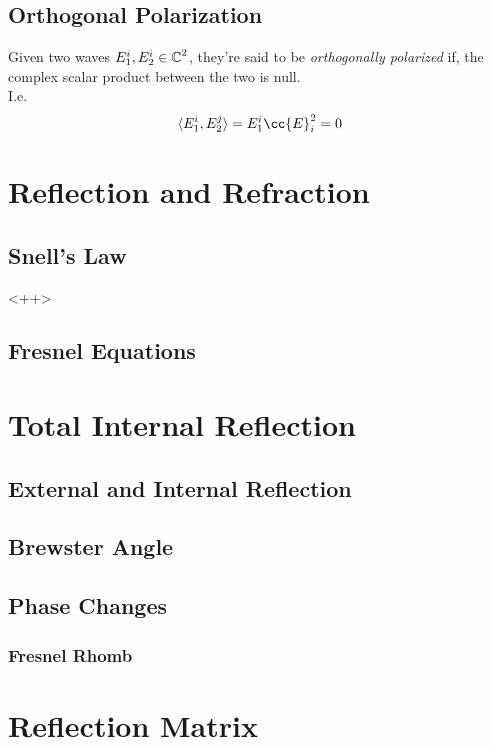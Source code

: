 \documentclass[../electromagnetism.tex]{subfiles}
\begin{document}
\subsection{Orthogonal Polarization}
Given two waves $E_1^i,E_2^i\in\operatorname{\mathbb{C}}^2$, they're said to be \textit{orthogonally polarized} if, the complex scalar product between the two is null.\\
I.e.
\begin{equation}
	\langle E_1^i, E_2^j \rangle = E_1^i\cc{E}^2_i=0
	\label{eq:orthpol}
\end{equation}
%
\section{Reflection and Refraction}
\subsection{Snell's Law}
<++>
\subsection{Fresnel Equations}
\section{Total Internal Reflection}
\subsection{External and Internal Reflection}
\subsection{Brewster Angle}
\subsection{Phase Changes}
\subsubsection{Fresnel Rhomb}
\section{Reflection Matrix}
\end{document}
